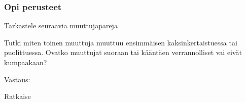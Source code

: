 \begin{tehtavasivu}

\subsubsection*{Opi perusteet}

\begin{tehtava}
    Tarkastele seuraavia muuttujapareja
    \begin{alakohdat}
    \end{alakohdat}
    Tutki miten toinen muuttuja muuttuu ensimmäisen kaksinkertaistuessa tai puolittuessa. Ovatko muuttujat suoraan tai kääntäen verrannolliset vai eivät kumpaakaan?
    \begin{vastaus}
        Vastaus:
        \begin{alakohdat}
        \end{alakohdat}
    \end{vastaus}
\end{tehtava}

\begin{tehtava}
Ratkaise
\begin{alakohdatrivi}
\end{alakohdatrivi}
\begin{vastaus}
\begin{alakohdat}
\end{alakohdat}
\end{vastaus}
\end{tehtava}


\end{tehtavasivu}
